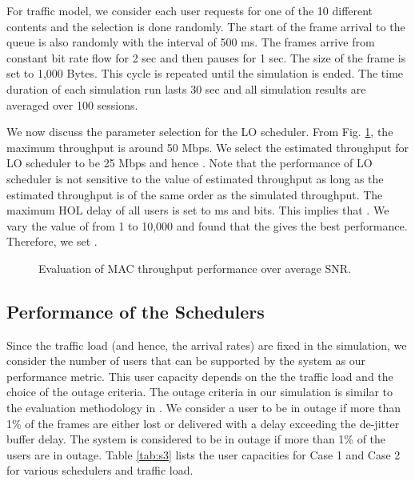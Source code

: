 \documentclass[conference]{IEEEtran}
\newcommand{\0}{\vect{0}}
\newcommand{\1}{\vect{1}}
\begin{document}
For traffic model, we consider each user requests for one of the 10 different contents and the selection is done randomly. The start of the frame arrival to the queue is also randomly with the interval of 500 ms. The frames arrive from constant bit rate flow for 2 sec and then pauses for 1 sec. The size of the frame is set to 1,000 Bytes. This cycle is repeated until the simulation is ended. The time duration of each simulation run lasts 30 sec and all simulation results are averaged over 100 sessions.


We now discuss the parameter selection for the LO scheduler. From Fig. \ref{fig:p1}, the maximum throughput is around 50 Mbps. We select the estimated  throughput for  LO scheduler to be 25 Mbps and hence . Note that the performance of LO scheduler is not sensitive to the value of estimated  throughput as long as the estimated  throughput is of the same order as the simulated throughput. The maximum HOL delay of all users is set to  ms and  bits. This implies that . We vary the value of  from 1 to 10,000 and found that the  gives the best performance. Therefore, we set .

\begin{figure}[!t]
\begin{center}
\textwidth \leavevmode
{}
\caption{Evaluation of MAC throughput performance over average SNR.}
\label{fig:p1}
\end{center}
\end{figure}


\subsection{Performance of the Schedulers}

Since the traffic load (and hence, the arrival rates) are fixed in the simulation, we consider the  number of users that can be supported by the system as our performance metric. This user capacity depends on the the traffic load and the choice of the outage criteria. The outage criteria in our simulation is similar to the evaluation methodology in \cite{3GPPTR25.814}. We consider a user to be in outage if more than 1\% of the frames are either lost or delivered with a delay exceeding the de-jitter buffer delay. The system is considered to be in outage if more than 1\% of the users are in outage. Table \ref{tab:s3} lists the user capacities for Case 1 and Case 2 for various schedulers and traffic load.
\end{document}

